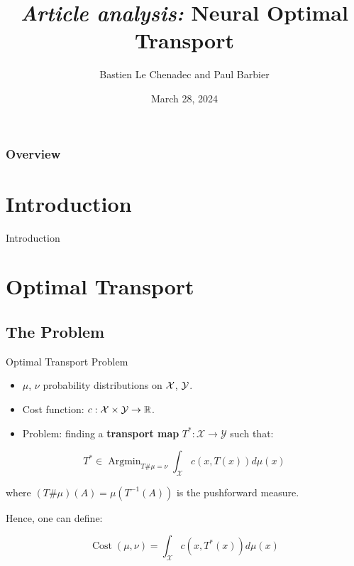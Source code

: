 \documentclass{beamer}
\title[Generative Images]{\textit{Article analysis:} Neural Optimal Transport} %
\author{Bastien Le Chenadec and Paul Barbier} %
\institute[MVA, Ponts] %
\date{March 28, 2024} %
\newcommand{\R}{\mathbb{R}}
\DeclareMathOperator*{\Argmin}{\text{Argmin}}
\DeclareMathOperator*{\Cost}{\text{Cost}}
\begin{document}
\begin{frame}
\titlepage%
\end{frame}

\begin{frame}
\frametitle{Overview} %
\tableofcontents %
\end{frame}


\section{Introduction}
\begin{frame}{Introduction}
    
\end{frame}

\section{Optimal Transport}

\subsection{The Problem}
\begin{frame}{Optimal Transport Problem}
\begin{itemize}
    \item $\mu$, $\nu$ probability distributions on ${\cal X}$, ${\cal Y}$.
    \item Cost function: $c:{\cal X}\times\mathcal{\cal Y}\to\R$.
    \item Problem: finding a \textbf{transport map} $T^*:\mathcal{X}\to \mathcal{Y}$ such that:
\end{itemize}

\begin{equation}
    T^* \in \Argmin_{T\#\mu=\nu} \int_{\mathcal{X}} c(x,T(x))d\mu(x)
\end{equation}

where $(T\#\mu)(A)=\mu(T^{-1}(A))$ is the pushforward measure.

Hence, one can define:

\begin{equation}
    \Cost(\mu,\nu) = \int_{\mathcal{X}} c(x,T^*(x))d\mu(x)
\end{equation}

\end{frame}
\end{document}
